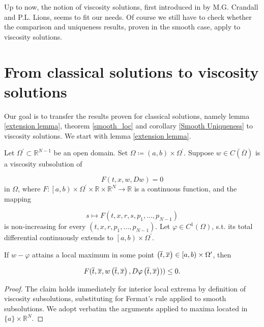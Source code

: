 	Up to now, the notion of viscosity solutions, first introduced in \cite{lions} by M.G. Crandall and P.L. Lions, seems to fit our needs. Of course we still have to check whether the comparison and uniqueness results, proven in the smooth case, apply to viscosity solutions.
	
	\section{From classical solutions to viscosity solutions}
	Our goal is to transfer the results proven for classical solutions, namely lemma \ref{extension lemma}, theorem \ref{smooth_loc} and corollary \ref{Smooth Uniqueness} to viscosity solutions. We start with lemma \ref{extension lemma}.
	
	\begin{lemma}
		\label{extension lemma viscosity}
		Let $ \Omega^{\prime} \subset \mathbb{R}^{N-1} $ be an open domain. Set $ \Omega \coloneqq \left( a, b \right) \times \Omega^{\prime} $. Suppose $ w \in C (\overline{\Omega})$ is a viscosity subsolution of
		
		\begin{equation*}
		F(t, x, w, Dw) = 0
		\end{equation*}
		in $ \Omega $, where $ F : \left[ a, b \right) \times \Omega^{\prime} \times \mathbb{R} \times \mathbb{R}^{N} \to \mathbb{R} $ is a continuous function, and the mapping
		
		\begin{equation*}
		s \mapsto F(t, x, r, s, p_1, \ldots, p_{N-1})
		\end{equation*}
		is non-increasing for every $ (t, x, r, p_1, \ldots, p_{N-1}) $. Let $ \varphi \in C^{1} \left( \Omega \right) $, s.t. its total differential continuously extends to $ \left[a, b\right) \times \Omega^{\prime} $.
		
		If $ w - \varphi $ attains a local maximum in some point $ \left(\overline{t}, \overline{x}\right) \in \left[a, b\right) \times \Omega^{\prime} $, then
		
		\begin{equation*}
		F(\overline{t}, \overline{x}, w\left(\overline{t}, \overline{x}\right), D\varphi\left(\overline{t}, \overline{x}\right))) \leq 0.
		\end{equation*}
		
		\begin{proof}
			The claim holds immediately for interior local extrema by definition of viscosity subsolutions, substituting for Fermat's rule applied to smooth subsolutions. We adopt verbatim the arguments applied to maxima located in $ \{a\} \times \mathbb{R}^N $.
		\end{proof}
	\end{lemma}

